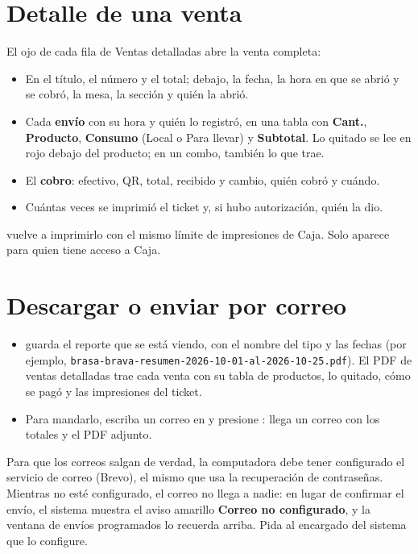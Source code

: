 
\section{Detalle de una venta}


El ojo de cada fila de Ventas detalladas abre la venta completa:

\begin{itemize}
  \item En el título, el número y el total; debajo, la fecha, la hora en que se abrió y se cobró, la mesa, la sección y quién la abrió.
  \item Cada \textbf{envío} con su hora y quién lo registró, en una tabla con \textbf{Cant.}, \textbf{Producto}, \textbf{Consumo} (Local o Para llevar) y \textbf{Subtotal}. Lo quitado se lee en rojo debajo del producto; en un combo, también lo que trae.
  \item El \textbf{cobro}: efectivo, QR, total, recibido y cambio, quién cobró y cuándo.
  \item Cuántas veces se imprimió el ticket y, si hubo autorización, quién la dio.
\end{itemize}

 vuelve a imprimirlo con el mismo límite de impresiones de Caja. Solo aparece para quien tiene acceso a Caja.

\section{Descargar o enviar por correo}

\begin{itemize}
  \item {} guarda el reporte que se está viendo, con el nombre del tipo y las fechas (por ejemplo, \texttt{brasa-brava-resumen-2026-10-01-al-2026-10-25.pdf}). El PDF de ventas detalladas trae cada venta con su tabla de productos, lo quitado, cómo se pagó y las impresiones del ticket.
  \item Para mandarlo, escriba un correo en  y presione : llega un correo con los totales y el PDF adjunto.
\end{itemize}

\begin{importante}
Para que los correos salgan de verdad, la computadora debe tener configurado el servicio de correo (Brevo), el mismo que usa la recuperación de contraseñas. Mientras no esté configurado, el correo no llega a nadie: en lugar de confirmar el envío, el sistema muestra el aviso amarillo \textbf{Correo no configurado}, y la ventana de envíos programados lo recuerda arriba. Pida al encargado del sistema que lo configure.
\end{importante}


